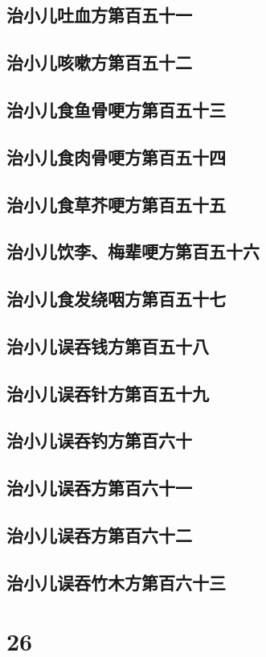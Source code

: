 \documentclass[a4paper,12pt,UTF8,twoside]{ctexbook}
\begin{document}
\chapter{治小儿吐血方第百五十一}
\chapter{治小儿咳嗽方第百五十二}
\chapter{治小儿食鱼骨哽方第百五十三}
\chapter{治小儿食肉骨哽方第百五十四}
\chapter{治小儿食草芥哽方第百五十五}
\chapter{治小儿饮李、梅辈哽方第百五十六}
\chapter{治小儿食发绕咽方第百五十七}
\chapter{治小儿误吞钱方第百五十八}
\chapter{治小儿误吞针方第百五十九}
\chapter{治小儿误吞钓方第百六十}
\chapter{治小儿误吞方第百六十一}
\chapter{治小儿误吞方第百六十二}
\chapter{治小儿误吞竹木方第百六十三}

\part{26}
\end{document}
